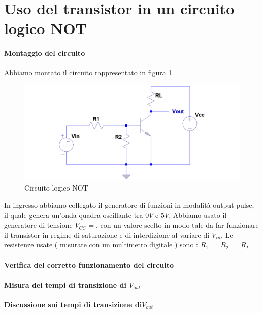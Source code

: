 \documentclass[10pt,a4paper]{article}
\begin{document}
\section{Uso del transistor in un circuito logico NOT }
\paragraph{Montaggio del circuito}
Abbiamo montato il circuito rappresentato in  figura \ref{circuito2}.
\begin{figure}[!htb]
  \centering
  \includegraphics[scale=0.4]{circuito2}
\caption{Circuito logico NOT}
\label{circuito2}
\end{figure} 

In ingresso abbiamo collegato  il generatore di funzioni in modalità output pulse, il quale genera un’onda quadra oscillante tra $0 V$ e $5 V$. Abbiamo usato  il generatore di tensione $V_{CC}=$, con un valore scelto in modo tale da far funzionare il transistor  in regime di saturazione e di interdizione al variare di $V_{in}$. Le resistenze usate ( misurate con un multimetro digitale ) sono : $R_1=$ $R_2=$ $R_L=$

\paragraph{Verifica del corretto funzionamento del circuito}
\paragraph{Misura dei tempi di transizione di $V_{out}$ }

\paragraph{Discussione sui tempi di transizione di$ V_{out}$}
\end{document}
